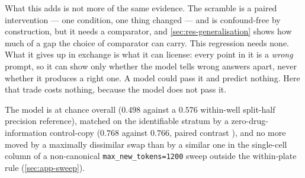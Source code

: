   What this adds is not more of the same evidence. The scramble is a paired
  intervention --- one condition, one thing changed --- and is confound-free by
  construction, but it needs a comparator, and \cref{sec:res-generalisation} shows
  how much of a gap the choice of comparator can carry. This regression needs none.
  What it gives up in exchange is what it can license: every point in it is a
  \emph{wrong} prompt, so it can show only whether the model tells wrong answers
  apart, never whether it produces a right one. A model could pass it and predict
  nothing. Here that trade costs nothing, because the model does not pass it.

\begin{claim}
The model is at chance overall ($0.498$ against a $0.576$ within-well split-half
precision reference), matched on the identifiable stratum by a
zero-drug-information control-copy ($0.768$ against $0.766$, paired contrast
), and no more moved by a maximally dissimilar swap
than by a similar one in the single-cell column of a non-canonical
\texttt{max\_new\_tokens=1200} sweep outside the within-plate rule
(\cref{sec:app-sweep}). 
\end{claim}
